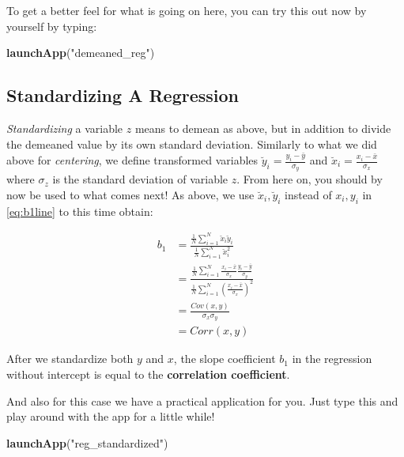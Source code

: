 \documentclass[]{book}
\newenvironment{Shaded}{\begin{snugshade}}{\end{snugshade}}
\newcommand{\KeywordTok}[1]{\textcolor[rgb]{0.13,0.29,0.53}{\textbf{#1}}}
\newcommand{\StringTok}[1]{\textcolor[rgb]{0.31,0.60,0.02}{#1}}
\newcommand{\NormalTok}[1]{#1}
\newenvironment{tip}{\begin{tcolorbox}[colback=green!5!white,colframe=green]}{\end{tcolorbox}}
\begin{document}
 To get a better feel for what is going on here, you can try this out
now by yourself by typing:

\begin{Shaded}
\begin{Highlighting}[]
\KeywordTok{launchApp}\NormalTok{(}\StringTok{"demeaned_reg"}\NormalTok{)}
\end{Highlighting}
\end{Shaded}

\subsection{Standardizing A Regression}\label{reg-standard}

\emph{Standardizing} a variable \(z\) means to demean as above, but in
addition to divide the demeaned value by its own standard deviation.
Similarly to what we did above for \emph{centering}, we define
transformed variables \(\breve{y}_i = \frac{y_i-\bar{y}}{\sigma_y}\) and
\(\breve{x}_i = \frac{x_i-\bar{x}}{\sigma_x}\) where \(\sigma_z\) is the
standard deviation of variable \(z\). From here on, you should by now be
used to what comes next! As above, we use \(\breve{x}_i,\breve{y}_i\)
instead of \(x_i,y_i\) in \eqref{eq:b1line} to this time obtain:

\begin{align}
b_1 &= \frac{\frac{1}{N}\sum_{i=1}^N \breve{x}_i \breve{y}_i}{\frac{1}{N}\sum_{i=1}^N \breve{x}_i^2}\\
    &= \frac{\frac{1}{N}\sum_{i=1}^N \frac{x_i - \bar{x}}{\sigma_x} \frac{y_i - \bar{y}}{\sigma_y}}{\frac{1}{N}\sum_{i=1}^N \left(\frac{x_i - \bar{x}}{\sigma_x}\right)^2} \\
    &= \frac{Cov(x,y)}{\sigma_x \sigma_y} \\
    &= Corr(x,y)  \label{eq:bline-standardized}
\end{align}

\begin{tip}
After we standardize both \(y\) and \(x\), the slope coefficient \(b_1\)
in the regression without intercept is equal to the \textbf{correlation
coefficient}.
\end{tip}

 And also for this case we have a practical application for you. Just
type this and play around with the app for a little while!

\begin{Shaded}
\begin{Highlighting}[]
\KeywordTok{launchApp}\NormalTok{(}\StringTok{"reg_standardized"}\NormalTok{)}
\end{Highlighting}
\end{Shaded}
\end{document}

